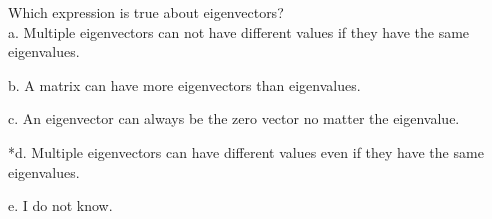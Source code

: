 
Which expression is true about eigenvectors?\\

a. Multiple eigenvectors can not have different values if they have the same eigenvalues. 

b. A matrix can have more eigenvectors than eigenvalues.

c. An eigenvector can always be the zero vector no matter the eigenvalue.

*d. Multiple eigenvectors can have different values even if they have the same eigenvalues.

e. I do not know.\\

